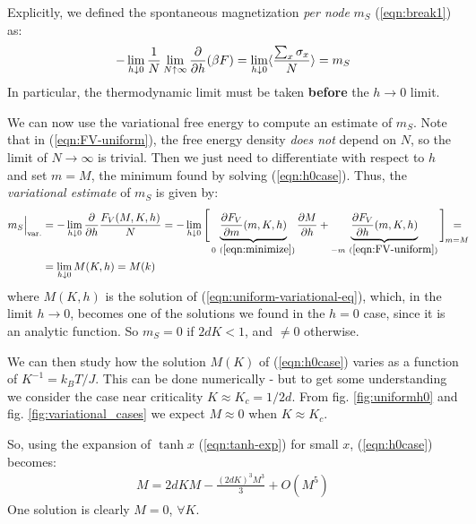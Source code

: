 \documentclass[../../main.tex]{subfiles}
\begin{document}
\medskip

Explicitly, we defined the spontaneous magnetization \textit{per node}  $m_S$ (\ref{eqn:break1}) as:
\begin{align}\label{eqn:ms}
    -\lim_{h \downarrow 0} \frac{1}{N} \lim_{N \uparrow \infty} \pdv{h} (\beta F) = \lim_{h \downarrow 0} \langle \frac{\sum_x \sigma_x}{N}  \rangle = m_S
\end{align}
In particular, the thermodynamic limit must be taken \textbf{before} the $h \to 0$ limit.

We can now use the variational free energy to compute an estimate of $m_S$. Note that in (\ref{eqn:FV-uniform}), the free energy density \textit{does not} depend on $N$, so the limit of $N \to \infty$ is trivial. Then we just need to differentiate with respect to $h$ and set $m = M$, the minimum found by solving (\ref{eqn:h0case}). Thus, the \textit{variational estimate} of $m_S$ is given by:
\begin{align}\nonumber
    m_S\Big|_{\mathrm{var.}} &= -\lim_{h \downarrow 0} \pdv{h} \frac{F_V(M, K, h)}{N} = -\lim_{h \downarrow 0} \Bigg[\underbrace{{\pdv{F_V}{m}}(m, K, h)}_{0\ (\ref{eqn:minimize})} \pdv{M}{h} + \underbrace{{\pdv{F_V}{h}}(m, K, h)}_{-m\ (\ref{eqn:FV-uniform})} \Bigg]_{\quad\mathclap{m = M}} \mathclap{=} \\
    &= \lim_{h \downarrow 0} M(K,h) = M(k)
    \label{eqn:variational-spontaneous-magnetization}
\end{align} 
where $M(K,h)$ is the solution of (\ref{eqn:uniform-variational-eq}), which, in the limit $h \to 0$, becomes one of the solutions we found in the $h=0$ case, since it is an analytic function. So $m_S = 0$ if $2dK < 1$, and $\neq 0$ otherwise.

\medskip

We can then study how the solution $M(K)$ of (\ref{eqn:h0case}) varies as a function of $K^{-1} = k_B T/J$. This can be done numerically - but to get some understanding we consider the case near criticality $K \approx K_c = 1/2d$. From fig. \ref{fig:uniformh0} and fig. \ref{fig:variational_cases} we expect $M \approx 0$ when $K \approx K_c$.

\medskip

So, using the expansion of $\tanh x$ (\ref{eqn:tanh-exp}) for small $x$, (\ref{eqn:h0case}) becomes:
\begin{align*}
    M = 2dKM- \frac{(2dK)^3 M^3}{3} + O(M^5) 
\end{align*}
One solution is clearly $M=0$, $\forall K$. 
\end{document}
